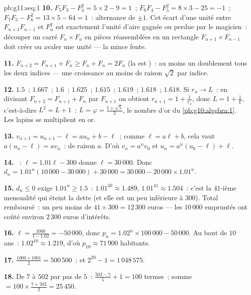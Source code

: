 \begin{solution}{pb:g11:seq:1}
\textbf{10.} $F_5 F_3 - F_4^2 = 5 \times 2 - 9 = 1$~;
$F_6 F_4 - F_5^2 = 8 \times 3 - 25 = -1$~;
$F_7 F_5 - F_6^2 = 13 \times 5 - 64 = 1$~: alternance de
$\pm 1$. Cet écart d'une unité entre $F_{n+1} F_{n-1}$ et $F_n^2$
est exactement l'unité d'aire gagnée ou perdue par le magicien~:
découper un carré $F_n \times F_n$ en pièces réassemblées en un
rectangle $F_{n+1} \times F_{n-1}$ doit créer ou avaler une unité
--- la mince fente.

\textbf{11.} $F_{n+2} = F_{n+1} + F_n \geq F_n + F_n = 2F_n$ (la
 est )~: au moins un doublement tous les deux indices
--- une croissance au moins  de raison $\sqrt2$ par
indice.

\textbf{12.} $1.5$~; $1.667$~; $1.6$~; $1.625$~; $1.615$~;
$1.619$~; $1.618$~; $1.618$. Si $r_n \to L$~: en divisant
$F_{n+2} = F_{n+1} + F_n$ par $F_{n+1}$ on obtient
$r_{n+1} = 1 + \frac{1}{r_n}$, donc $L = 1 + \frac1L$,
c'est-à-dire $L^2 = L + 1$~: $L = \varphi = \frac{1 + \sqrt5}{2}$,
le nombre d'or du \cref{pb:g10:algebra:1}. Les lapins se
multiplient en or.

\textbf{13.} $v_{n+1} = u_{n+1} - \ell = a u_n + b - \ell$~; comme
$\ell = a\ell + b$, cela vaut $a(u_n - \ell) = a v_n$~:  de raison $a$. D'où $v_n = a^n v_0$ et
$u_n = a^n (u_0 - \ell) + \ell$.

\textbf{14.} ~: $\ell = 1.01\ell - 300$ donne
$\ell = 30\,000$. Donc
$d_n = 1.01^n (10\,000 - 30\,000) + 30\,000
= 30\,000 - 20\,000 \times 1.01^n$.

\textbf{15.} $d_n \leq 0$ exige $1.01^n \geq 1.5$~:
$1.01^{40} \approx 1.489$, $1.01^{41} \approx 1.504$~: c'est la
$41$-ième mensualité qui éteint la dette (et elle est un peu
inférieure à $300$). Total remboursé~: un peu moins de
$41 \times 300 = 12\,300$ euros --- les $10\,000$ empruntés ont
coûté environ $2\,300$ euros d'intérêts.

\textbf{16.}  $\ell = \frac{1000}{1 - 1.02} = -50\,000$,
donc $p_n = 1.02^n \times 100\,000 - 50\,000$. Au bout de $10$
ans~: $1.02^{10} \approx 1.219$, d'où
$p_{10} \approx 71\,900$ habitants.

\textbf{17.} $\frac{1000 \times 1001}{2} = 500\,500$~; et
$2^{20} - 1 = 1\,048\,575$.

\textbf{18.} De $7$ à $502$ par pas de $5$~:
$\frac{502 - 7}{5} + 1 = 100$ termes~; somme
$= 100 \times \frac{7 + 502}{2} = 25\,450$.


\end{solution}
